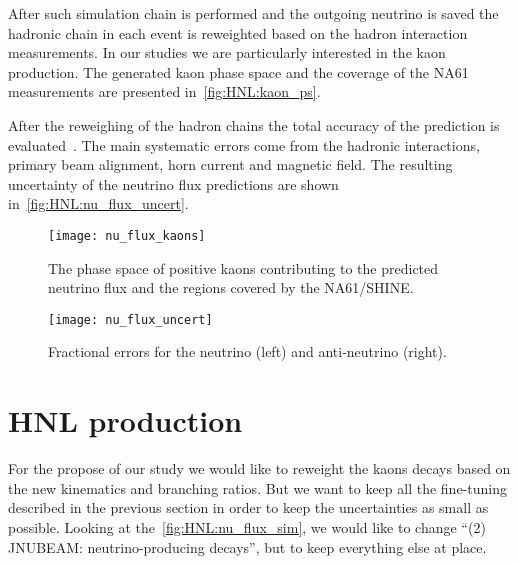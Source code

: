 \documentclass[../main.tex]{subfiles}
\begin{document}
After such simulation chain is performed and the outgoing neutrino is saved the hadronic chain in each event is reweighted based on the hadron interaction measurements. In our studies we are particularly interested in the kaon production. The generated kaon phase space and the coverage of the NA61 measurements are presented in~\autoref{fig:HNL:kaon_ps}.

After the reweighing of the hadron chains the total accuracy of the prediction is evaluated~\cite{Abe2013}. The main systematic errors come from the hadronic interactions, primary beam alignment, horn current and magnetic field. The resulting uncertainty of the neutrino flux predictions are shown in~\autoref{fig:HNL:nu_flux_uncert}.

\begin{figure}[!ht]
    \begin{minipage}[!ht]{0.49\linewidth}
        \centering
        \texttt{[image: nu\_flux\_kaons]}
        \caption{The phase space of positive kaons contributing to the predicted neutrino flux and the regions covered by the NA61/SHINE.}
        \label{fig:HNL:kaon_ps}
    \end{minipage}
    \hfill
    \begin{minipage}[!ht]{0.49\linewidth}
        \centering
        \texttt{[image: nu\_flux\_uncert]}
        \caption{Fractional errors for the neutrino (left) and anti-neutrino (right).}
        \label{fig:HNL:nu_flux_uncert}
    \end{minipage}
\end{figure}


\section{HNL production}

For the propose of our study we would like to reweight the kaons decays based on the new kinematics and branching ratios. But we want to keep all the fine-tuning described in the previous section in order to keep the uncertainties as small as possible. Looking at the~\autoref{fig:HNL:nu_flux_sim}, we would like to change ``(2) JNUBEAM: neutrino-producing decays'', but to keep everything else at place.
\end{document}
